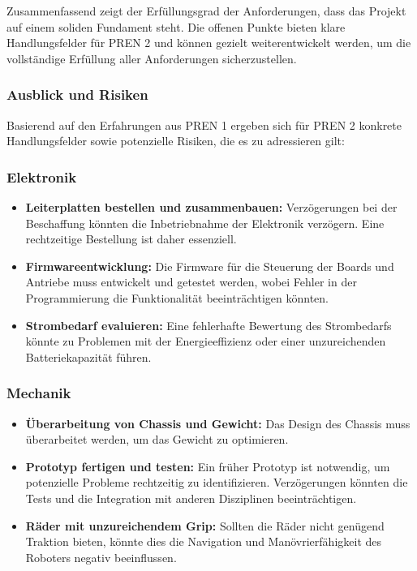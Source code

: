 \documentclass[main.tex]{subfiles} %
\begin{document}
Zusammenfassend zeigt der Erfüllungsgrad der Anforderungen, dass das Projekt auf  
einem soliden Fundament steht. Die offenen Punkte bieten klare Handlungsfelder  
für PREN 2 und können gezielt weiterentwickelt werden, um die vollständige  
Erfüllung aller Anforderungen sicherzustellen.

\subsubsection{Ausblick und Risiken}  
Basierend auf den Erfahrungen aus PREN 1 ergeben sich für PREN 2 konkrete  
Handlungsfelder sowie potenzielle Risiken, die es zu adressieren gilt:  

\subsubsection*{Elektronik}  
\begin{itemize}  
    \item \textbf{Leiterplatten bestellen und zusammenbauen:}  
    Verzögerungen bei der Beschaffung könnten die Inbetriebnahme der  
    Elektronik verzögern. Eine rechtzeitige Bestellung ist daher essenziell.  
    \item \textbf{Firmwareentwicklung:}  
    Die Firmware für die Steuerung der Boards und Antriebe muss entwickelt  
    und getestet werden, wobei Fehler in der Programmierung die Funktionalität  
    beeinträchtigen könnten.  
    \item \textbf{Strombedarf evaluieren:}  
    Eine fehlerhafte Bewertung des Strombedarfs könnte zu Problemen mit der  
    Energieeffizienz oder einer unzureichenden Batteriekapazität führen.  
\end{itemize}  

\subsubsection*{Mechanik}  
\begin{itemize}  
    \item \textbf{Überarbeitung von Chassis und Gewicht:}  
    Das Design des Chassis muss überarbeitet werden, um das  
    Gewicht zu optimieren.
    \item \textbf{Prototyp fertigen und testen:}  
    Ein früher Prototyp ist notwendig, um potenzielle Probleme rechtzeitig zu  
    identifizieren. Verzögerungen könnten die Tests und die Integration mit  
    anderen Disziplinen beeinträchtigen. 
    \item \textbf{Räder mit unzureichendem Grip:}  
    Sollten die Räder nicht genügend Traktion bieten, könnte dies die Navigation  
    und Manövrierfähigkeit des Roboters negativ beeinflussen.  
\end{itemize}  
\end{document}
